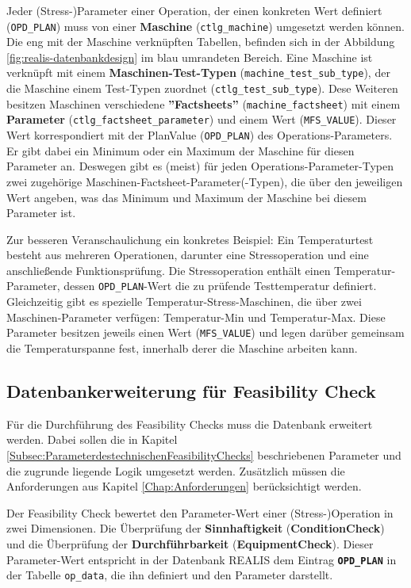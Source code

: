 Jeder (Stress-)Parameter einer Operation, der einen konkreten Wert definiert (\texttt{OPD\_\-PLAN}) muss von einer \textbf{Maschine} (\texttt{ctlg\_machine}) umgesetzt werden können. Die eng mit der Maschine verknüpften Tabellen, befinden sich in der Abbildung \ref{fig:realis-datenbankdesign} im blau umrandeten Bereich. Eine Maschine ist verknüpft mit einem \textbf{Maschinen-Test-Typen} (\texttt{machine\_test\_sub\_type}), der die Maschine einem Test-Typen zuordnet (\texttt{ctlg\_test\_sub\_type}). Dese Weiteren besitzen Maschinen verschiedene \textbf{''Fact\-sheets''} (\texttt{machine\_factsheet}) mit einem \textbf{Parameter} (\texttt{ctlg\_factsheet\_parameter}) und einem Wert (\texttt{MFS\_VALUE}). Dieser Wert korrespondiert mit der PlanValue (\texttt{OPD\_PLAN}) des Operations-Parameters. 
Er gibt dabei ein Minimum oder ein Maximum der Maschine für diesen Parameter an. Deswegen gibt es (meist) für jeden Operations-Parameter-Typen zwei zugehörige Maschinen-Factsheet-Parameter(-Typen), die über den jeweiligen Wert angeben, was das Minimum und Maximum der Maschine bei diesem Parameter ist.

Zur besseren Veranschaulichung ein konkretes Beispiel: Ein Temperaturtest besteht aus mehreren Operationen, darunter eine Stressoperation und eine anschließende Funktionsprüfung. Die Stressoperation enthält einen Temperatur-Parameter, dessen \texttt{OPD\_PLAN}-Wert die zu prüfende Testtemperatur definiert. Gleichzeitig gibt es spezielle Temperatur-Stress-Maschinen, die über zwei Maschinen-Parameter verfügen: Temperatur-Min und Temperatur-Max. Diese Parameter besitzen jeweils einen Wert (\texttt{MFS\_VALUE}) und legen darüber gemeinsam die Temperaturspanne fest, innerhalb derer die Maschine arbeiten kann.


\subsection{Datenbankerweiterung für Feasibility Check}

Für die Durchführung des Feasibility Checks muss die Datenbank erweitert werden. Dabei sollen die in Kapitel \ref{Subsec:ParameterdestechnischenFeasibilityChecks} beschriebenen Parameter und die zugrunde liegende Logik umgesetzt werden. Zusätzlich müssen die Anforderungen aus Kapitel \ref{Chap:Anforderungen} berücksichtigt werden.

Der Feasibility Check bewertet den Parameter-Wert einer (Stress-)Operation in zwei Dimensionen. Die Überprüfung der \textbf{Sinnhaftigkeit} (\textbf{\gls{ConditionCheck}}) und die Überprüfung der \textbf{Durchführbarkeit} (\textbf{\gls{EquipmentCheck}}). 
Dieser Parameter-Wert entspricht in der Datenbank REALIS dem Eintrag \textbf{\texttt{OPD\_PLAN}} in der Tabelle \texttt{op\_data}, die ihn definiert und den Parameter darstellt.


